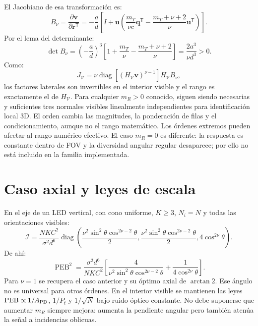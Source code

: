 \documentclass[11pt,a4paper]{article}
\newcommand{\PEB}{\operatorname{PEB}}
\begin{document}
El Jacobiano de esa transformación es:
\begin{equation}
 B_\nu=\frac{\partial\mathbf v}{\partial\mathbf r^{\mathsf T}}
 =-\frac{a}{d}\left[I+\mathbf u\left(\frac{m_T}{\nu c}\mathbf q^{\mathsf T}
 -\frac{m_T+\nu+2}{\nu}\mathbf u^{\mathsf T}\right)\right].
\end{equation}
Por el lema del determinante:
\begin{equation}
 \det B_\nu=\left(-\frac ad\right)^3\left[1+\frac{m_T}{\nu}-\frac{m_T+\nu+2}{\nu}\right]
 =\frac{2a^3}{\nu d^3}>0.
\end{equation}
Como:
\begin{equation}
 J_{\mathcal V}=\nu\operatorname{diag}\left[(H_{\mathcal V}\mathbf v)^{\nu-1}\right]H_{\mathcal V}B_\nu,
\end{equation}
los factores laterales son invertibles en el interior visible y el rango es exactamente el de $H_{\mathcal V}$. Para cualquier $m_R>0$ conocido, siguen siendo necesarias y suficientes tres normales visibles linealmente independientes para identificación local 3D. El orden cambia las magnitudes, la ponderación de filas y el condicionamiento, aunque no el rango matemático. Los órdenes extremos pueden afectar al rango numérico efectivo. El caso $m_R=0$ es diferente: la respuesta es constante dentro de FOV y la diversidad angular regular desaparece; por ello no está incluido en la familia implementada.

\section{Caso axial y leyes de escala}
En el eje de un LED vertical, con cono uniforme, $K\geq3$, $N_i=N$ y todas las orientaciones visibles:
\begin{equation}
 \mathcal I=\frac{NKC^2}{\sigma^2d^6}\operatorname{diag}\left(
 \frac{\nu^2\sin^2\theta\cos^{2\nu-2}\theta}{2},
 \frac{\nu^2\sin^2\theta\cos^{2\nu-2}\theta}{2},
 4\cos^{2\nu}\theta\right).
\end{equation}
De ahí:
\begin{equation}
 \PEB^2=\frac{\sigma^2d^6}{NKC^2}\left[
 \frac4{\nu^2\sin^2\theta\cos^{2\nu-2}\theta}+\frac1{4\cos^{2\nu}\theta}\right].
\label{eq:axial}
\end{equation}
Para $\nu=1$ se recupera el caso anterior y su óptimo axial de $\arctan2$. Ese ángulo no es universal para otros órdenes. En el interior visible se mantienen las leyes $\PEB\propto1/A_{\rm PD}$, $1/P_t$ y $1/\sqrt N$ bajo ruido óptico constante. No debe suponerse que aumentar $m_R$ siempre mejora: aumenta la pendiente angular pero también atenúa la señal a incidencias oblicuas.
\end{document}
